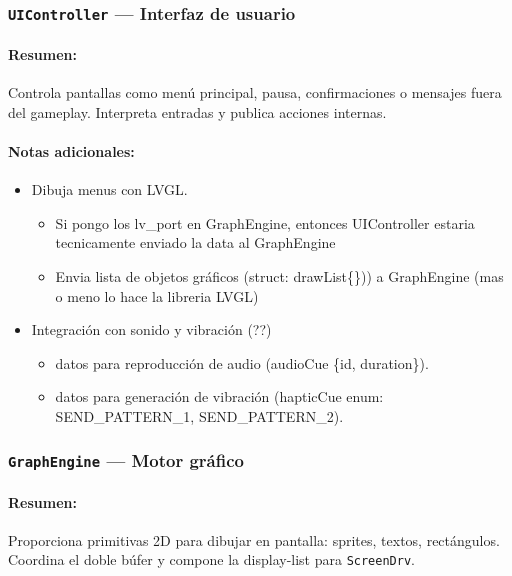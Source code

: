 \documentclass[11pt,a4paper]{article}
\begin{document}
\subsubsection{\texttt{UIController} — Interfaz de usuario}
\paragraph{Resumen:} Controla pantallas como menú principal, pausa, confirmaciones o mensajes fuera del gameplay. Interpreta entradas y publica acciones internas.
\paragraph{Notas adicionales:}
\begin{itemize}
  \item Dibuja menus con LVGL. 
  \begin{itemize}
    \item Si pongo los lv\_port en GraphEngine, entonces UIController estaria tecnicamente enviado la data al GraphEngine
    \item Envia lista de objetos gráficos (struct: drawList\{\})) a GraphEngine (mas o meno lo hace la libreria LVGL)
  \end{itemize}
  \item Integración con sonido y vibración (??)
  \begin{itemize}
    \item datos para reproducción de audio (audioCue \{id, duration\}).
    \item datos para generación de vibración (hapticCue enum: SEND\_PATTERN\_1, SEND\_PATTERN\_2).
  \end{itemize}
\end{itemize}

\subsubsection{\texttt{GraphEngine} — Motor gráfico}
\paragraph{Resumen:} Proporciona primitivas 2D para dibujar en pantalla: sprites, textos, rectángulos. Coordina el doble búfer y compone la display-list para \texttt{ScreenDrv}.
\end{document}
